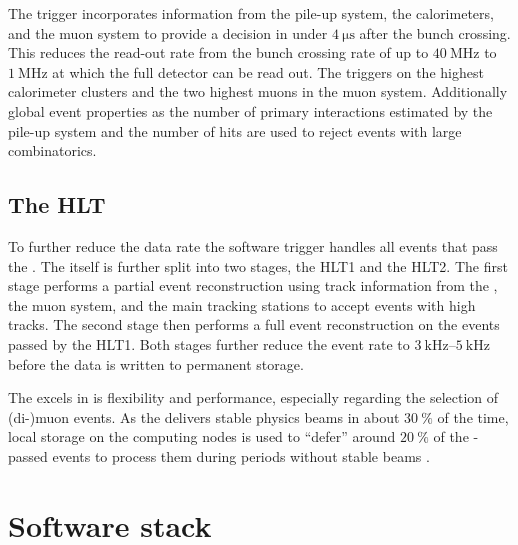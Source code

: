 The \LZero trigger incorporates information from the \VELO pile-up system, the
calorimeters, and the muon system to provide a decision in under
$\SI{4}{\micro\second}$ after the bunch crossing. This reduces the read-out rate
from the \LHC bunch crossing rate of up to $\SI{40}{\mega\hertz}$ to
$\SI{1}{\mega\hertz}$ at which the full detector can be read out. The \LZero
triggers on the highest \ET calorimeter clusters and the two highest \pT muons
in the muon system. Additionally global event properties as the number of
primary \protonproton interactions estimated by the \VELO pile-up system and the
number of \SPD hits are used to reject events with large combinatorics.

\subsection{The \acl*{HLT}}
\label{sec:lhcb_experiment:trigger:hlt}

To further reduce the data rate the \HLT software trigger handles all events
that pass the \LZero. The \HLT itself is further split into two stages, the
\acs{HLT}1 and the \acs{HLT}2. The first stage performs a partial event
reconstruction using track information from the \VELO, the muon system, and the
main tracking stations to accept events with high \pT tracks. The second \HLT
stage then performs a full event reconstruction on the events passed by the
\acs{HLT}1. Both \HLT stages further reduce the event rate to
$\SIrange[range-units = single, range-phrase = -]{3}{5}{\kilo\hertz}$ before the
data is written to permanent storage.

The \HLT excels in is flexibility and performance, especially regarding the
selection of (di-)muon events. As the \LHC delivers stable physics beams in
about $\SI{30}{\percent}$ of the time, local storage on the computing nodes is
used to \enquote{defer} around $\SI{20}{\percent}$ of the \LZero-passed events
to process them during periods without stable beams \cite{Frank:2014ixa}.

\section{Software stack}
\label{sec:lhcb_experiment:software}

